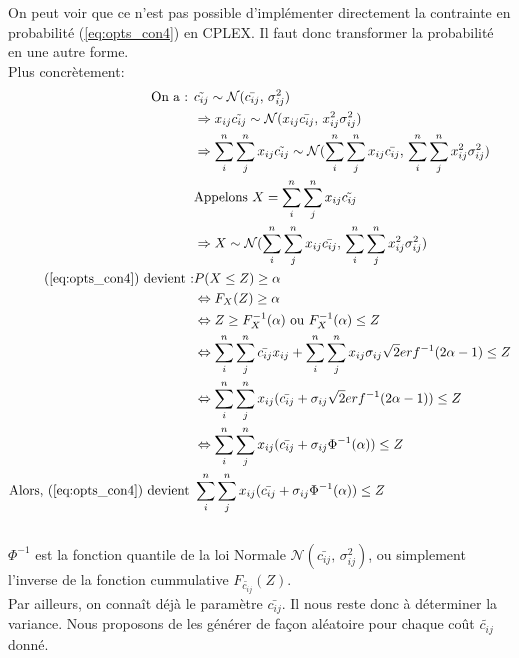 \documentclass{article}
\begin{document}
On peut voir que ce n'est pas possible d'implémenter directement la contrainte en probabilité (\ref{eq:opts_con4}) en CPLEX. Il faut donc transformer la probabilité en une autre forme.\\
Plus concrètement:\\
\begin{equation}
\begin{aligned}
\textrm{On a : } 
& \tilde{c_{ij}} \sim \mathcal{N}(\bar{c_{ij}},\,\sigma_{ij}^{2})\\
&\Rightarrow x_{ij}\tilde{c_{ij}} \sim \mathcal{N}(x_{ij}\bar{c_{ij}},\, x_{ij}^2\sigma_{ij}^{2})\\
&\Rightarrow \sum_{i}^n \sum_{j}^n x_{ij}\tilde{c_{ij}} \sim \mathcal{N}(\sum_{i}^n \sum_{j}^n x_{ij}\bar{c_{ij}},\, \sum_{i}^n \sum_{j}^n x_{ij}^2\sigma_{ij}^{2})\\
&\textrm{Appelons } X = \sum_{i}^n \sum_{j}^n x_{ij}\tilde{c_{ij}}\\ 
&\Rightarrow X \sim \mathcal{N}(\sum_{i}^n \sum_{j}^n x_{ij}\bar{c_{ij}},\, \sum_{i}^n \sum_{j}^n x_{ij}^2\sigma_{ij}^{2})\\
\textrm{(\ref{eq:opts_con4}) devient :} 
& P(X \leq Z) \geq \alpha \\
&\Leftrightarrow F_X(Z) \geq \alpha\\
&\Leftrightarrow Z \geq F_X^{-1}(\alpha) \textrm{ ou } F_X^{-1}(\alpha) \leq Z\\
&\Leftrightarrow \sum_i^n \sum_j^n \bar{c_{ij}} x_{ij} + \sum_i^n \sum_j^n x_{ij} \sigma_{ij} \sqrt{2}erf^{-1}(2\alpha - 1) \leq Z\\
&\Leftrightarrow \sum_i^n \sum_j^n x_{ij}  (\bar{c_{ij}}  + \sigma_{ij} \sqrt{2}erf^{-1}(2\alpha - 1)) \leq Z\\
&\Leftrightarrow \sum_i^n \sum_j^n x_{ij}  (\bar{c_{ij}}  + \sigma_{ij} \Phi^{-1}(\alpha)) \leq Z\\
\textrm{Alors, (\ref{eq:opts_con4}) devient } & \sum_i^n \sum_j^n x_{ij}  (\bar{c_{ij}}  + \sigma_{ij} \Phi^{-1}(\alpha)) \leq Z \label{eq:opts_con4q}\\
\end{aligned}
\end{equation}\\
\(\Phi^{-1}\) est la fonction quantile de la loi Normale \(\mathcal{N}(\bar{c_{ij}},\,\sigma_{ij}^{2})\), ou simplement l'inverse de la fonction cummulative \(F_{\tilde{c_{ij}}}(Z)\).\\
Par ailleurs, on connaît déjà le paramètre \(\bar{c_{ij}}\). Il nous reste donc à déterminer la variance. Nous proposons de les générer de façon aléatoire pour chaque coût \(\tilde{c_{ij}}\) donné.
\end{document}
